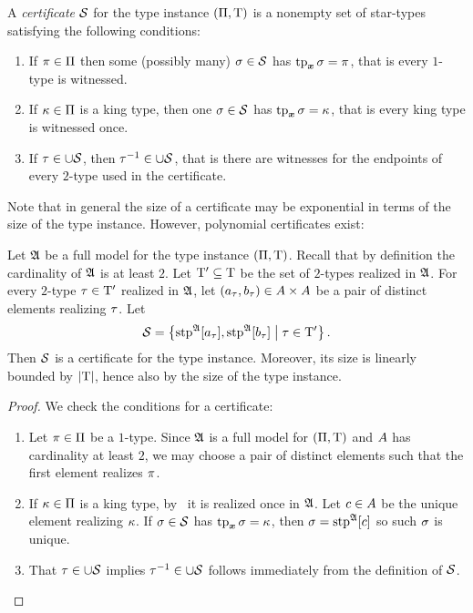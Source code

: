 \begin{definition}
A \emph{certificate} $\mathcal{S}$ for the type instance $(\Pi,\mathrm{T})$ is a
nonempty set of star-types satisfying the following conditions:
\begin{enumerate}
  \item\label{cond:cert-1} If $\pi \in \Pi$ then some (possibly many) $\sigma
  \in \mathcal{S}$ has $\operatorname{tp}_{\bm{x}}\sigma = \pi$, that is every $1$-type is witnessed.
  \item\label{cond:cert-2} If $\kappa \in \Pi$ is a king type, then one $\sigma
  \in \mathcal{S}$ has $\operatorname{tp}_{\bm{x}}\sigma = \kappa$, that is every king type is witnessed once.
  \item\label{cond:cert-3} If $\tau \in \cup\mathcal{S}$, then $\tau^{-1} \in
  \cup\mathcal{S}$, that is there are witnesses for the endpoints of every $2$-type used in the certificate.
\end{enumerate}
\end{definition}
Note that in general the size of a certificate may be exponential in terms of
the size of the type instance. However, polynomial certificates exist:
\begin{lemma}\label{lem:cert-extract}
Let $\mathfrak{A}$ be a full model for the type instance $(\Pi,\mathrm{T})$. Recall that
by definition the cardinality of $\mathfrak{A}$ is at least $2$.
Let ${\mathrm{T}'} \subseteq \mathrm{T}$ be the set of $2$-types realized in $\mathfrak{A}$.
For every $2$-type $\tau \in {\mathrm{T}'}$ realized in $\mathfrak{A}$, let $(a_\tau,
b_\tau) \in A\times A$ be a pair of distinct elements realizing
$\tau$.
Let 
\[
  \mathcal{S} = \left\{\operatorname{stp}^{\mathfrak{A}}[a_\tau], \operatorname{stp}^{\mathfrak{A}}[b_\tau]\mathrel{}\middle|\mathrel{}\tau \in
  {\mathrm{T}'}\right\}.
\]
Then $\mathcal{S}$ is a certificate for the type instance. Moreover, its size is
linearly bounded by $\left|\mathrm{T}\right|$, hence also by the size of the type instance.
\end{lemma}
\begin{proof}
We check the conditions for a certificate:
\begin{enumerate}
  \item Let $\pi \in \Pi$ be a $1$-type. Since $\mathfrak{A}$ is a full
  model for $(\Pi,\mathrm{T})$ and $A$ has cardinality at least $2$, we may
  choose a pair of distinct elements such that the first element realizes
  $\pi$.
  \item If $\kappa \in \Pi$ is a king type, by~ it
  is realized once in $\mathfrak{A}$.
  Let $c \in A$ be the unique element realizing $\kappa$.
  If $\sigma \in \mathcal{S}$ has $\operatorname{tp}_{\bm{x}}\sigma = \kappa$, then $\sigma = \operatorname{stp}^{\mathfrak{A}}[c]$
  so such $\sigma$ is unique.
  \item That $\tau \in \cup\mathcal{S}$ implies $\tau^{-1} \in \cup\mathcal{S}$ follows
  immediately from the definition of $\mathcal{S}$.
\end{enumerate}
\end{proof}

